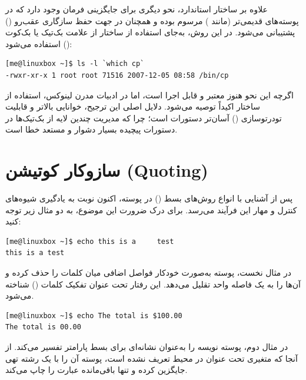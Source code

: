 علاوه بر ساختار استاندارد، نحو دیگری برای جایگزینی فرمان وجود دارد که در پوسته‌های قدیمی‌تر (مانند ) مرسوم بوده و همچنان در  جهت حفظ سازگاری عقب‌رو () پشتیبانی می‌شود. در این روش، به‌جای استفاده از ساختار  از علامت بک‌تیک یا بک‌کوت () استفاده می‌شود:

\begin{latin}
\begin{lstlisting}
[me@linuxbox ~]$ ls -l `which cp`
-rwxr-xr-x 1 root root 71516 2007-12-05 08:58 /bin/cp
\end{lstlisting}
\end{latin}

اگرچه این نحو هنوز معتبر و قابل اجرا است، اما در ادبیات مدرن لینوکس، استفاده از ساختار  اکیداً توصیه می‌شود. دلایل اصلی این ترجیح، خوانایی بالاتر و قابلیت تودرتوسازی () آسان‌تر دستورات است؛ چرا که مدیریت چندین لایه از بک‌تیک‌ها در دستورات پیچیده بسیار دشوار و مستعد خطا است.

\section{سازوکار کوتیشن (Quoting)}

پس از آشنایی با انواع روش‌های بسط () در پوسته، اکنون نوبت به یادگیری شیوه‌های کنترل و مهار این فرآیند می‌رسد. برای درک ضرورت این موضوع، به دو مثال زیر توجه کنید:

\begin{latin}
\begin{lstlisting}
[me@linuxbox ~]$ echo this is a     test
this is a test
\end{lstlisting}
\end{latin}

در مثال نخست، پوسته به‌صورت خودکار فواصل اضافی میان کلمات را حذف کرده و آن‌ها را به یک فاصله واحد تقلیل می‌دهد. این رفتار تحت عنوان تفکیک کلمات () شناخته می‌شود.

\begin{latin}
\begin{lstlisting}
[me@linuxbox ~]$ echo The total is $100.00
The total is 00.00
\end{lstlisting}
\end{latin}

در مثال دوم، پوسته نویسه \cmd{\$} را به‌عنوان نشانه‌ای برای بسط پارامتر تفسیر می‌کند. از آنجا که متغیری تحت عنوان  در محیط تعریف نشده است، پوسته آن را با یک رشته تهی جایگزین کرده و تنها باقی‌مانده عبارت را چاپ می‌کند.

